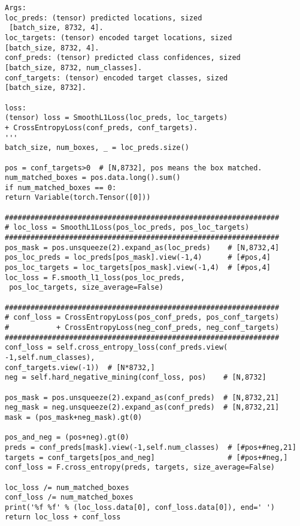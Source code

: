 \begin{lstlisting}
Args:
loc_preds: (tensor) predicted locations, sized
 [batch_size, 8732, 4].
loc_targets: (tensor) encoded target locations, sized 
[batch_size, 8732, 4].
conf_preds: (tensor) predicted class confidences, sized 
[batch_size, 8732, num_classes].
conf_targets: (tensor) encoded target classes, sized 
[batch_size, 8732].

loss:
(tensor) loss = SmoothL1Loss(loc_preds, loc_targets) 
+ CrossEntropyLoss(conf_preds, conf_targets).
'''
batch_size, num_boxes, _ = loc_preds.size()

pos = conf_targets>0  # [N,8732], pos means the box matched.
num_matched_boxes = pos.data.long().sum()
if num_matched_boxes == 0:
return Variable(torch.Tensor([0]))

################################################################
# loc_loss = SmoothL1Loss(pos_loc_preds, pos_loc_targets)
################################################################
pos_mask = pos.unsqueeze(2).expand_as(loc_preds)    # [N,8732,4]
pos_loc_preds = loc_preds[pos_mask].view(-1,4)      # [#pos,4]
pos_loc_targets = loc_targets[pos_mask].view(-1,4)  # [#pos,4]
loc_loss = F.smooth_l1_loss(pos_loc_preds,
 pos_loc_targets, size_average=False)

################################################################
# conf_loss = CrossEntropyLoss(pos_conf_preds, pos_conf_targets)
#           + CrossEntropyLoss(neg_conf_preds, neg_conf_targets)
################################################################
conf_loss = self.cross_entropy_loss(conf_preds.view(
-1,self.num_classes), 
conf_targets.view(-1))  # [N*8732,]
neg = self.hard_negative_mining(conf_loss, pos)    # [N,8732]

pos_mask = pos.unsqueeze(2).expand_as(conf_preds)  # [N,8732,21]
neg_mask = neg.unsqueeze(2).expand_as(conf_preds)  # [N,8732,21]
mask = (pos_mask+neg_mask).gt(0)

pos_and_neg = (pos+neg).gt(0)
preds = conf_preds[mask].view(-1,self.num_classes)  # [#pos+#neg,21]
targets = conf_targets[pos_and_neg]                 # [#pos+#neg,]
conf_loss = F.cross_entropy(preds, targets, size_average=False)

loc_loss /= num_matched_boxes
conf_loss /= num_matched_boxes
print('%f %f' % (loc_loss.data[0], conf_loss.data[0]), end=' ')
return loc_loss + conf_loss
\end{lstlisting}
